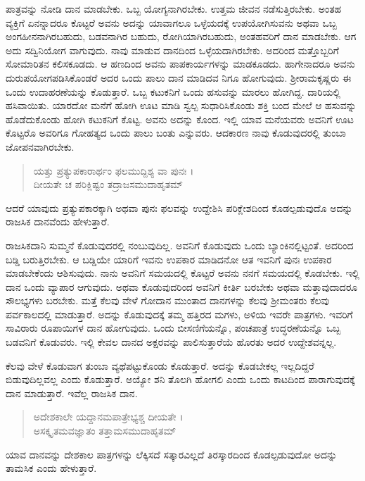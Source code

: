 ಪಾತ್ರವನ್ನು ನೋಡಿ ದಾನ ಮಾಡಬೇಕು. ಒಬ್ಬ ಯೋಗ್ಯನಾಗಿರಬೇಕು. ಉತ್ತಮ ಜೀವನ ನಡೆಸುತ್ತಿರಬೇಕು. ಅಂತಹ ವ್ಯಕ್ತಿಗೆ ಏನನ್ನಾದರೂ ಕೊಟ್ಟರೆ ಅವನು ಅದನ್ನು ಯಾವಾಗಲೂ ಒಳ್ಳೆಯದಕ್ಕೆ ಉಪಯೋಗಿಸುವನು ಅಥವಾ ಒಬ್ಬ ಅಂಗಹೀನನಾಗಿರಬಹುದು, ಬಡವನಾಗಿರ ಬಹುದು, ರೋಗಿಯಾಗಿರಬಹುದು, ಅಂತಹವರಿಗೆ ದಾನ ಮಾಡಬೇಕು. ಆಗ ಅದು ಸದ್ವಿನಿಯೋಗ ವಾಗುವುದು. ನಾವು ಮಾಡುವ ದಾನದಿಂದ ಒಳ್ಳೆಯದಾಗಿರಬೇಕು. ಅದರಿಂದ ಮತ್ತೊಬ್ಬರಿಗೆ ಸೋಮಾರಿತನ ಕಲಿಸಕೂಡದು. ಆ ಹಣದಿಂದ ಅವನು ಪಾಪಕಾರ್ಯಗಳನ್ನು ಮಾಡಕೂಡದು. ಹಾಗೇನಾದರೂ ಅವನು ದುರುಪಯೋಗಪಡಿಸಿಕೊಂಡರೆ ಅದರ ಒಂದು ಪಾಲು ದಾನ ಮಾಡಿದವ ನಿಗೂ ಹೋಗುವುದು. ಶ್ರೀರಾಮಕೃಷ್ಣರು ಈ ಒಂದು ಉದಾಹರಣೆಯನ್ನು ಕೊಡುತ್ತಾರೆ. ಒಬ್ಬ ಕಟುಕನಿಗೆ ಒಂದು ಹಸುವನ್ನು ಮಾರಲು ಹೋಗಿದ್ದ. ದಾರಿಯಲ್ಲಿ ಹಸಿವಾಯಿತು. ಯಾರದೋ ಮನೆಗೆ ಹೋಗಿ ಊಟ ಮಾಡಿ ಸ್ವಲ್ಪ ಸುಧಾರಿಸಿಕೊಂಡು ಶಕ್ತಿ ಬಂದ ಮೇಲೆ ಆ ಹಸುವನ್ನು ಹೊಡೆದುಕೊಂಡು ಹೋಗಿ ಕಟುಕನಿಗೆ ಕೊಟ್ಟ. ಅವನು ಅದನ್ನು ಕೊಂದ. ಇಲ್ಲಿ ಯಾವ ಮನೆಯವರು ಅವನಿಗೆ ಊಟ ಕೊಟ್ಟರೊ ಅವರಿಗೂ ಗೋಹತ್ಯದ ಒಂದು ಪಾಲು ಬಂತು ಎನ್ನುವರು. ಆದಕಾರಣ ನಾವು ಕೊಡುವುದರಲ್ಲಿ ತುಂಬಾ ಜೋಪನವಾಗಿರಬೇಕು.

\begin{verse}
ಯತ್ತು ಪ್ರತ್ಯುಪಕಾರಾರ್ಥಂ ಫಲಮುದ್ದಿಶ್ಯ ವಾ ಪುನಃ ।\\ದೀಯತೇ ಚ ಪರಿಕ್ಲಿಷ್ಟಂ ತದ್ರಾಜಸಮುದಾಹೃತಮ್ 
\end{verse}

{\small ಆದರೆ ಯಾವುದು ಪ್ರತ್ಯುಪಕಾರಕ್ಕಾಗಿ ಅಥವಾ ಪುನಃ ಫಲವನ್ನು ಉದ್ದೇಶಿಸಿ ಪರಿಕ್ಲೇಶದಿಂದ ಕೊಡಲ್ಪಡುವುದೊ ಅದನ್ನು ರಾಜಸಿಕ ದಾನವೆಂದು ಹೇಳುತ್ತಾರೆ.}

ರಾಜಸಿಕದಾನಿ ಸುಮ್ಮನೆ ಕೊಡುವುದರಲ್ಲಿ ನಂಬುವುದಿಲ್ಲ. ಅವನಿಗೆ ಕೊಡುವುದು ಒಂದು ಬ್ಯಾಂಕಿನಲ್ಲಿಟ್ಟಂತೆ. ಅದರಿಂದ ಬಡ್ಡಿ ಬರುತ್ತಿರಬೇಕು. ಆ ಬಡ್ಡಿಯೇ ಯಾರಿಗೆ ಇವನು ಉಪಕಾರ ಮಾಡಿದನೋ ಆತ ಇವನಿಗೆ ಪುನಃ ಉಪಕಾರ ಮಾಡಬೇಕೆಂದು ಆಶಿಸುವುದು. ನಾನು ಅವನಿಗೆ ಸಮಯದಲ್ಲಿ ಕೊಟ್ಟರೆ ಅವನು ನನಗೆ ಸಮಯದಲ್ಲಿ ಕೊಡಬೇಕು. ಇಲ್ಲಿ ದಾನ ಒಂದು ವ್ಯಾಪಾರ ಆಗುವುದು. ಅಥವಾ ಕೊಡುವುದರಿಂದ ಅವನಿಗೆ ಕೀರ್ತಿ ಬರಬೇಕು ಅಥವಾ ಮತ್ತಾವುದಾದರೂ ಸೌಲಭ್ಯಗಳು ಬರಬೇಕು. ಮತ್ತೆ ಕೆಲವು ವೇಳೆ ಗೋದಾನ ಮುಂತಾದ ದಾನಗಳನ್ನು ಕೆಲವು ಶ್ರೀಮಂತರು ಕೆಲವು ಪರ್ವಕಾಲದಲ್ಲಿ ಮಾಡುತ್ತಾರೆ. ಅದನ್ನು ಕೊಡುವುದಕ್ಕೆ ತಮ್ಮ ಹತ್ತಿರದ ಮಗಳು, ಅಳಿಯ ಇವರೇ ಪಾತ್ರಗಳು. ಇವರಿಗೆ ಸಾವಿರಾರು ರೂಪಾಯಿಗಳ ದಾನ ಹೋಗುವುದು. ಒಂದು ಬೀಸಣಿಗೆಯನ್ನೊ, ಪಂಚಪಾತ್ರೆ ಉದ್ಧರಣೆಯನ್ನೊ ಒಬ್ಬ ಬಡವನಿಗೆ ಕೊಡುವರು. ಇಲ್ಲಿ ಕೇವಲ ದಾನದ ಅಕ್ಷರವನ್ನು ಪಾಲಿಸುತ್ತಾರೆಯೆ ಹೊರತು ಅದರ ಉದ್ದೇಶವನ್ನಲ್ಲ.

ಕೆಲವು ವೇಳೆ ಕೊಡುವಾಗ ತುಂಬಾ ವ್ಯಥೆಪಟ್ಟುಕೊಂಡು ಕೊಡುತ್ತಾರೆ. ಅದನ್ನು ಕೊಡಬೇಕಲ್ಲ ಇಲ್ಲದಿದ್ದರೆ ಬಿಡುವುದಿಲ್ಲವಲ್ಲ ಎಂದು ಕೊಡುತ್ತಾರೆ. ಅಯ್ಯೋ ಶನಿ ತೊಲಗಿ ಹೋಗಲಿ ಎಂದು ಒಂದು ಕಾಟದಿಂದ ಪಾರಾಗುವುದಕ್ಕೆ ದಾನ ಮಾಡುತ್ತಾರೆ. ಇವೆಲ್ಲ ರಾಜಸಿಕ ದಾನ.

\begin{verse}
ಅದೇಶಕಾಲೇ ಯದ್ದಾನಮಪಾತ್ರೇಭ್ಯಶ್ಚ ದೀಯತೇ ।\\ಅಸಕ್ಕೃತಮವಜ್ಞಾತಂ ತತ್ತಾಮಸಮುದಾಹೃತಮ್ 
\end{verse}

{\small ಯಾವ ದಾನವನ್ನು ದೇಶಕಾಲ ಪಾತ್ರಗಳನ್ನು ಲೆಕ್ಕಿಸದೆ ಸತ್ಕಾರವಿಲ್ಲದೆ ತಿರಸ್ಕಾರದಿಂದ ಕೊಡಲ್ಪಡುವುದೋ ಅದನ್ನು ತಾಮಸಿಕ ಎಂದು ಹೇಳುತ್ತಾರೆ.}

